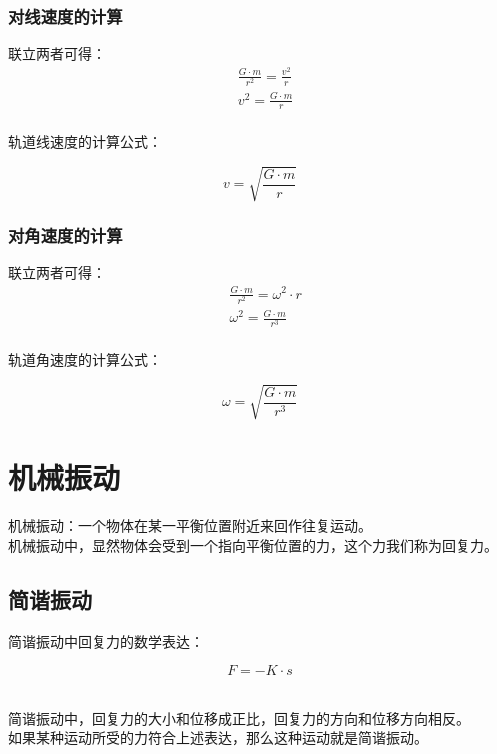 \documentclass[UTF8]{ctexart}
\begin{document}
\subsubsection{对线速度的计算}
    联立两者可得：
    \begin{align}
        &\frac{G\cdot m}{r^2}=\frac{v^2}{r}\\[3mm]
        &v^2=\frac{G\cdot m}{r}
    \end{align}\\
    轨道线速度的计算公式：
    \begin{large}
        \begin{equation*}
            v=\sqrt{\frac{G\cdot m}{r}}
        \end{equation*}
    \end{large}

\subsubsection{对角速度的计算}
    联立两者可得：
    \begin{align}
        &\frac{G\cdot m}{r^2}=\omega^2\cdot r\\[3mm]
        &\omega^2=\frac{G\cdot m}{r^3}
    \end{align}\\
    轨道角速度的计算公式：
    \begin{large}
        \begin{equation*}
            \omega=\sqrt{\frac{G\cdot m}{r^3}}
        \end{equation*}
    \end{large}

\newpage

\section{机械振动}
    机械振动：一个物体在某一平衡位置附近来回作往复运动。\\[3mm]
    机械振动中，显然物体会受到一个指向平衡位置的力，这个力我们称为回复力。

\subsection{简谐振动}
    简谐振动中回复力的数学表达：
    \begin{large}
        \begin{equation*}
            F=-K\cdot s
        \end{equation*}
    \end{large}\\
    简谐振动中，回复力的大小和位移成正比，回复力的方向和位移方向相反。\\[3mm]
    如果某种运动所受的力符合上述表达，那么这种运动就是简谐振动。
\end{document}
